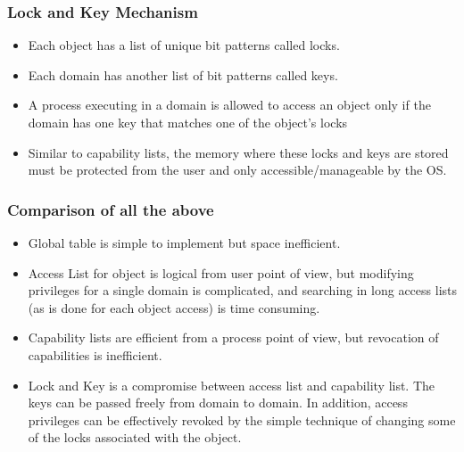 \documentclass{article}
\theoremstyle{plain}
\theoremstyle{definition}
\begin{document}
\subsubsection{Lock and Key Mechanism}
\begin{itemize}
    \item Each object has a list of unique bit patterns called locks.
    
    \item Each domain has another list of bit patterns called keys.
    
    \item  A process executing in a domain is allowed to access an object only if the domain has one key that matches one of the object's locks 
    
    \item Similar to capability lists, the memory where these locks and keys are stored must be protected from the user and only accessible/manageable by the OS. 
\end{itemize}

\subsubsection{Comparison of all the above}
\begin{itemize}
    \item Global table is simple to implement but space inefficient.
    
    \item Access List for object is logical from user point of view, but modifying privileges for a single domain is complicated, and searching in long access lists (as is done for each object access) is time consuming. 
    
    \item Capability lists are efficient from a process point of view, but revocation of capabilities is inefficient. 
    
    \item Lock and Key is a compromise between access list and capability list. The keys can be passed freely from domain to domain. In addition, access privileges can be effectively revoked by the simple technique of changing some of the locks associated with the object. 
\end{itemize}
\end{document}
